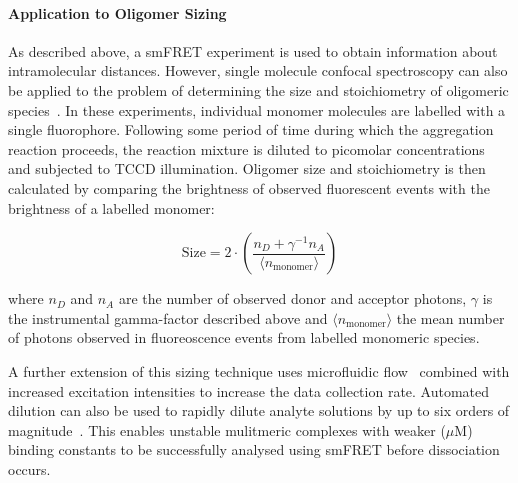\paragraph{Application to Oligomer Sizing}
As described above, a smFRET experiment is used to obtain information about intramolecular distances. However, single molecule confocal spectroscopy can also be applied to the problem of determining the size and stoichiometry of oligomeric species~\cite{orte10, cremades2012}. In these experiments, individual monomer molecules are labelled with a single fluorophore. Following some period of time during which the aggregation reaction proceeds, the reaction mixture is diluted to picomolar concentrations and subjected to TCCD illumination.  Oligomer size and stoichiometry is then calculated by comparing the brightness of observed fluorescent events with the brightness of a labelled monomer:

\begin{equation}
\text{Size} = 2 \cdot \left(\frac{n_D + \gamma^{-1}n_A}{\langle n_{\text{monomer}}\rangle}\right)
\label{eq:sizing}
\end{equation}

where $n_D$ and $n_A$ are the number of observed donor and acceptor photons, $\gamma$ is the instrumental gamma-factor described above and $\langle n_{\text{monomer}}\rangle$ the mean number of photons observed in fluoreoscence events from labelled monomeric species.

A further extension of this sizing technique uses microfluidic flow~\cite{horrocks12} combined with increased excitation intensities to increase the data collection rate. Automated dilution can also be used to rapidly dilute analyte solutions by up to six orders of magnitude~\cite{horrocks2013,}. This enables unstable mulitmeric complexes with weaker ($\mu$M) binding constants to be successfully analysed using smFRET before dissociation occurs.  





